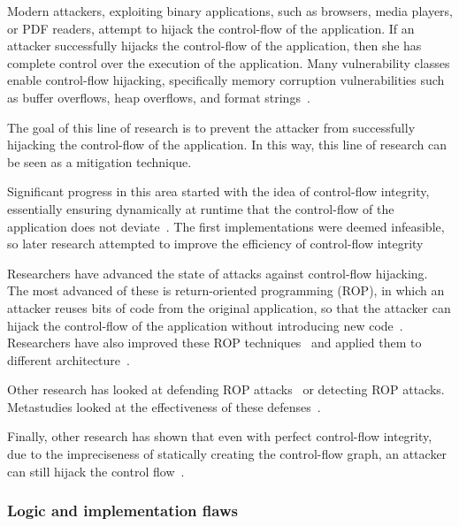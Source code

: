\documentclass[11pt,letterpaper]{article}
\begin{document}
Modern attackers, exploiting binary applications, such as browsers,
media players, or PDF readers, attempt to hijack the control-flow of
the application. If an attacker successfully hijacks the control-flow
of the application, then she has complete control over the execution
of the application. Many vulnerability classes enable control-flow
hijacking, specifically memory corruption vulnerabilities such as
buffer overflows, heap overflows, and format strings~\cite{Szekeres2013}.

The goal of this line of research is to prevent the attacker from
successfully hijacking the control-flow of the application. In this
way, this line of research can be seen as a mitigation technique.

Significant progress in this area started with the idea of
control-flow integrity, essentially ensuring dynamically at runtime
that the control-flow of the application does not
deviate~\cite{Abadi2005, Abadi2009}. The first implementations were
deemed infeasible, so later research attempted to improve the
efficiency of control-flow integrity~\cite{Zhang2013, Tice2014,
  Bletsch2011, Zhang2013, Zhang2013a}

Researchers have advanced the state of attacks against control-flow
hijacking. The most advanced of these is return-oriented programming
(ROP), in which an attacker reuses bits of code from the original
application, so that the attacker can hijack the control-flow of the
application without introducing new code~\cite{Roemer2012,
  Bletsch2010, Tran2011}. Researchers have also improved these ROP
techniques~\cite{Checkoway2010, Buchanan2008, Kayaalp2012, Chen2012,
  Goktas2014, Schwartz2011} and applied them to different
architecture~\cite{Davi2012}.

Other research has looked at defending ROP attacks~\cite{Pappas2012,
  Davi2009, Davi2011, Onarlioglu2010, Gupta2013, Pappas2012, Lu2011,
  Lu2011a, Homescu2012, Gokta2014, Cheng2014, Pappas2013, Snow2013,
  Hiser2012, Wartell2012} or detecting ROP
attacks\cite{Polychronakis2011}. Metastudies looked at the
effectiveness of these defenses~\cite{Skowyra2013, Schuster2014}.

Finally, other research has shown that even with perfect control-flow
integrity, due to the impreciseness of statically creating the
control-flow graph, an attacker can still hijack the control
flow~\cite{Carlini2015, Schuster2015, Carlini2014, Davi2014}.

\subsubsection{Logic and implementation flaws}
\end{document}
